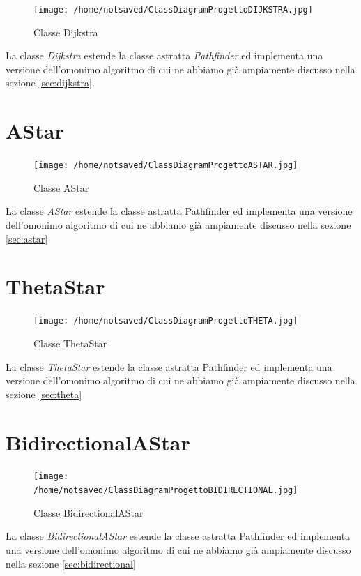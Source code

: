 \documentclass[11pt]{book}
\begin{document}
\begin{figure}[H]
\centering
\texttt{[image: /home/notsaved/ClassDiagramProgettoDIJKSTRA.jpg]}
\caption{Classe Dijkstra}
\label{classdijkstra}
\end{figure}

La classe \emph{Dijkstra} estende la classe astratta \emph{Pathfinder} ed implementa una versione dell'omonimo algoritmo di cui ne abbiamo gi\`a ampiamente discusso nella sezione \ref{sec:dijkstra}.

\section{AStar}

\begin{figure}[H]
\centering
\texttt{[image: /home/notsaved/ClassDiagramProgettoASTAR.jpg]}
\caption{Classe AStar}
\label{classastar}
\end{figure}

La classe \emph{AStar} estende la classe astratta Pathfinder ed implementa una versione dell'omonimo algoritmo di cui ne abbiamo gi\`a ampiamente discusso nella sezione \ref{sec:astar}

\section{ThetaStar}

\begin{figure}[H]
\centering
\texttt{[image: /home/notsaved/ClassDiagramProgettoTHETA.jpg]}
\caption{Classe ThetaStar}
\label{classtheta}
\end{figure}

La classe \emph{ThetaStar} estende la classe astratta Pathfinder ed implementa una versione dell'omonimo algoritmo di cui ne abbiamo gi\`a ampiamente discusso nella sezione \ref{sec:theta}

\section{BidirectionalAStar}

\begin{figure}[H]
\centering
\texttt{[image: /home/notsaved/ClassDiagramProgettoBIDIRECTIONAL.jpg]}
\caption{Classe BidirectionalAStar}
\label{classbidirectional}
\end{figure}

La classe \emph{BidirectionalAStar} estende la classe astratta Pathfinder ed implementa una versione dell'omonimo algoritmo di cui ne abbiamo gi\`a ampiamente discusso nella sezione \ref{sec:bidirectional}
\end{document}
